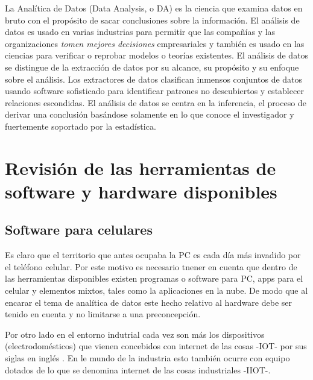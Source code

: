 \documentclass[]{article}
\begin{document}
La Analítica de Datos (Data Analysis, o DA) es la ciencia que examina
datos en bruto con el propósito de sacar conclusiones sobre la
información. El análisis de datos es usado en varias industrias para
permitir que las compañías y las organizaciones \emph{tomen mejores
decisiones} empresariales y también es usado en las ciencias para
verificar o reprobar modelos o teorías existentes. El análisis de datos
se distingue de la extracción de datos por su alcance, su propósito y su
enfoque sobre el análisis. Los extractores de datos clasifican inmensos
conjuntos de datos usando software sofisticado para identificar patrones
no descubiertos y establecer relaciones escondidas. El análisis de datos
se centra en la inferencia, el proceso de derivar una conclusión
basándose solamente en lo que conoce el investigador y fuertemente
soportado por la estadística.

\section{Revisión de las herramientas de software y hardware
disponibles}\label{revisiuxf3n-de-las-herramientas-de-software-y-hardware-disponibles}

\subsection{Software para celulares}\label{software-para-celulares}

Es claro que el territorio que antes ocupaba la PC es cada día más
invadido por el teléfono celular. Por este motivo es necesario tnener en
cuenta que dentro de las herramientas disponibles existen programas o
software para PC, apps para el celular y elementos mixtos, tales como la
aplicaciones en la nube. De modo que al encarar el tema de analítica de
datos este hecho relativo al hardware debe ser tenido en cuenta y no
limitarse a una preconcepción.

Por otro lado en el entorno indutrial cada vez son más los dispositivos
(electrodomésticos) que vienen concebidos con internet de las cosas
-IOT- por sus siglas en inglés . En le mundo de la industria esto
también ocurre con equipo dotados de lo que se denomina internet de las
cosas industriales -IIOT-.
\end{document}
